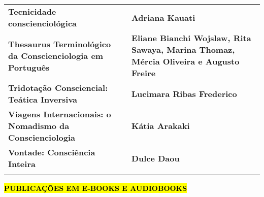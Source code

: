 \documentclass[
]{article}
\begin{document}
\begin{longtable}[]{@{}
  >{\raggedright\arraybackslash}p{}
  >{\raggedright\arraybackslash}p{}@{}}
\begin{minipage}[b]{\linewidth}\raggedright
\textbf{Tecnicidade conscienciológica}
\end{minipage} & \begin{minipage}[b]{\linewidth}\raggedright
\textbf{Adriana Kauati}
\end{minipage} \\
\begin{minipage}[b]{\linewidth}\raggedright
\textbf{Thesaurus Terminológico da Conscienciologia em Português}
\end{minipage} & \begin{minipage}[b]{\linewidth}\raggedright
\textbf{Eliane Bianchi Wojslaw, Rita Sawaya, Marina Thomaz, Mércia Oliveira e Augusto Freire}
\end{minipage} \\
\begin{minipage}[b]{\linewidth}\raggedright
\textbf{Tridotação Consciencial: Teática Inversiva}
\end{minipage} & \begin{minipage}[b]{\linewidth}\raggedright
\textbf{Lucimara Ribas Frederico}
\end{minipage} \\
\begin{minipage}[b]{\linewidth}\raggedright
\textbf{Viagens Internacionais: o Nomadismo da Conscienciologia}
\end{minipage} & \begin{minipage}[b]{\linewidth}\raggedright
\textbf{Kátia Arakaki}
\end{minipage} \\
\begin{minipage}[b]{\linewidth}\raggedright
\textbf{Vontade: Consciência Inteira}
\end{minipage} & \begin{minipage}[b]{\linewidth}\raggedright
\textbf{Dulce Daou}
\end{minipage} \\
\midrule\noalign{}
\endhead
\bottomrule\noalign{}
\endlastfoot
\end{longtable}

\textbf{\hl{PUBLICAÇÕES EM E-BOOKS E AUDIOBOOKS}}
\end{document}
